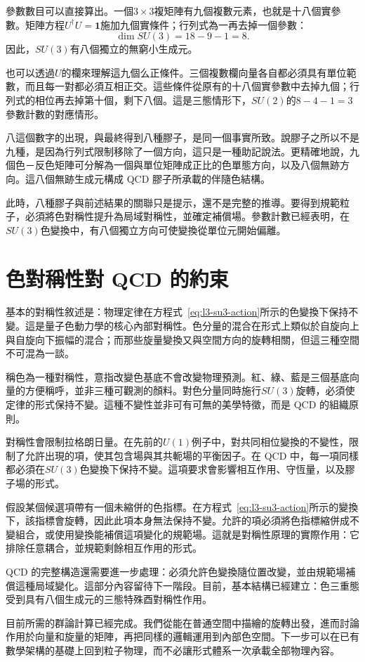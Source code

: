 參數數目可以直接算出。一個\(3\times3\)複矩陣有九個複數元素，也就是十八個實參數。矩陣方程\(U^\dagger U=\boldsymbol 1\)施加九個實條件；行列式為一再去掉一個參數：
\begin{equation}
\dim SU(3)=18-9-1=8.
\end{equation}
因此，\(SU(3)\)有八個獨立的無窮小生成元。

也可以透過\(U\)的欄來理解這九個么正條件。三個複數欄向量各自都必須具有單位範數，而且每一對都必須互相正交。這些條件從原有的十八個實參數中去掉九個；行列式的相位再去掉第十個，剩下八個。這是三態情形下，\(SU(2)\)的\(8-4-1=3\)參數計數的對應情形。

八這個數字的出現，與最終得到八種膠子，是同一個事實所致。說膠子之所以不是九種，是因為行列式限制移除了一個方向，這只是一種助記說法。更精確地說，九個色－反色矩陣可分解為一個與單位矩陣成正比的色單態方向，以及八個無跡方向。這八個無跡生成元構成 QCD 膠子所承載的伴隨色結構。

此時，八種膠子與前述結果的關聯只是提示，還不是完整的推導。要得到規範粒子，必須將色對稱性提升為局域對稱性，並確定補償場。參數計數已經表明，在\(SU(3)\)色變換中，有八個獨立方向可使變換從單位元開始偏離。

\section{色對稱性對 QCD 的約束}

基本的對稱性敘述是：物理定律在方程式~\eqref{eq:l3-su3-action}所示的色變換下保持不變。這是量子色動力學的核心內部對稱性。色分量的混合在形式上類似於自旋向上與自旋向下振幅的混合；而那些旋量變換又與空間方向的旋轉相關，但這三種空間不可混為一談。

稱色為一種對稱性，意指改變色基底不會改變物理預測。紅、綠、藍是三個基底向量的方便稱呼，並非三種可觀測的顏料。對色分量同時施行\(SU(3)\)旋轉，必須使定律的形式保持不變。這種不變性並非可有可無的美學特徵，而是 QCD 的組織原則。

對稱性會限制拉格朗日量。在先前的\(U(1)\)例子中，對共同相位變換的不變性，限制了允許出現的項，使其包含場與其共軛場的平衡因子。在 QCD 中，每一項同樣都必須在\(SU(3)\)色變換下保持不變。這項要求會影響相互作用、守恆量，以及膠子場的形式。

假設某個候選項帶有一個未縮併的色指標。在方程式~\eqref{eq:l3-su3-action}所示的變換下，該指標會旋轉，因此此項本身無法保持不變。允許的項必須將色指標縮併成不變組合，或使用變換能補償這項變化的規範場。這就是對稱性原理的實際作用：它排除任意耦合，並規範剩餘相互作用的形式。

QCD 的完整構造還需要進一步處理：必須允許色變換隨位置改變，並由規範場補償這種局域變化。這部分內容留待下一階段。目前，基本結構已經建立：色三重態受到具有八個生成元的三態特殊酉對稱性作用。

目前所需的群論計算已經完成。我們從能在普通空間中描繪的旋轉出發，進而討論作用於向量和旋量的矩陣，再把同樣的邏輯運用到內部色空間。下一步可以在已有數學架構的基礎上回到粒子物理，而不必讓形式體系一次承載全部物理內容。
